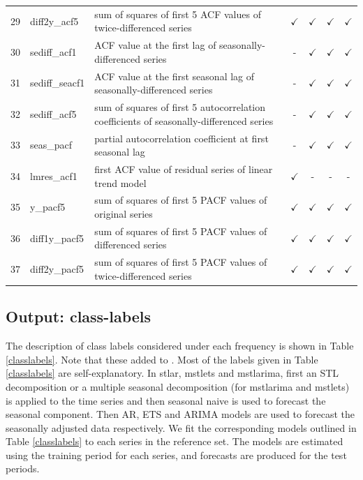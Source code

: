 \documentclass[11pt,a4paper,]{article}
\def\yes{$\checkmark$}
\begin{document}
\begin{table}[!htp]
\begin{tabular}{llp{}cccc}
29 & diff2y\_acf5   & sum of squares of first 5 ACF values of twice-differenced series                        & \yes  & \yes & \yes & \yes \\
30 & sediff\_acf1 & ACF value at the first lag of seasonally-differenced series                               & -     & \yes & \yes & \yes\\
31 & sediff\_seacf1 & ACF value at the first seasonal lag of seasonally-differenced series                    & -     & \yes & \yes & \yes\\
32 & sediff\_acf5   & sum of squares of first 5 autocorrelation coefficients of seasonally-differenced series & -     & \yes & \yes & \yes\\
33 & seas\_pacf     & partial autocorrelation coefficient at first seasonal lag & -     & \yes & \yes & \yes\\
34 & lmres\_acf1    & first ACF value of residual series of linear trend model                                & \yes  & - & - & -\\
35 & y\_pacf5       & sum of squares of first 5 PACF values of original series                                & \yes  & \yes & \yes & \yes\\
36 & diff1y\_pacf5  & sum of squares of first 5 PACF values of differenced series                             & \yes  & \yes & \yes & \yes\\
37 & diff2y\_pacf5  & sum of squares of first 5 PACF values of twice-differenced series                       & \yes  & \yes & \yes & \yes\\
\bottomrule
\end{tabular}
\end{table}

\hypertarget{output-class-labels}{%
\subsection{Output: class-labels}\label{output-class-labels}}

The description of class labels considered under each frequency is shown in Table \ref{classlabels}. Note that these added to \textcite{fforms}. Most of the labels given in Table \ref{classlabels} are self-explanatory. In stlar, mstlets and mstlarima, first an STL decomposition or a multiple seasonal decomposition (for mstlarima and mstlets) is applied to the time series and then seasonal naive is used to forecast the seasonal component. Then AR, ETS and ARIMA models are used to forecast the seasonally adjusted data respectively. We fit the corresponding models outlined in Table \ref{classlabels} to each series in the reference set. The models are estimated using the training period for each series, and forecasts are produced for the test periods.
\end{document}
